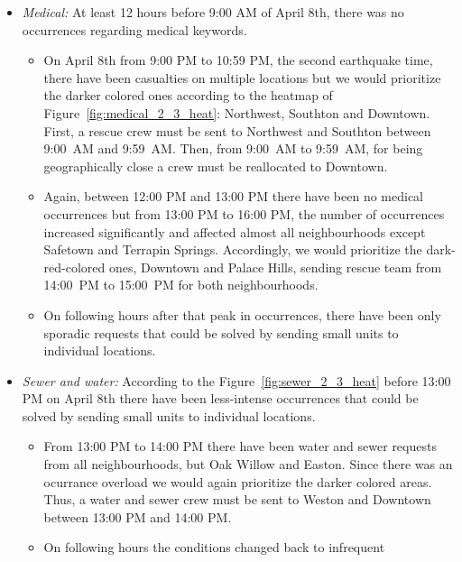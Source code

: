 \begin{itemize}                                                                  
    \item \emph{Medical:} At least 12 hours before 9:00 AM of April 8th, there
    was no occurrences regarding medical keywords. 
    \begin{itemize} 
        \item On April 8th from 9:00 PM to 10:59 PM, the second earthquake time,
        there have been casualties on multiple locations but we would prioritize 
        the darker colored ones according to the heatmap of
        Figure~\ref{fig:medical_2_3_heat}: 
        Northwest, Southton and Downtown. First, a rescue crew must be sent to 
        Northwest and Southton between 9:00~AM and 9:59~AM. Then, from 9:00~AM 
        to 9:59~AM, for being geographically close a crew must be reallocated to 
        Downtown. 
        \item Again, between 12:00 PM and 13:00 PM there have been no medical
        occurrences but from 13:00 PM to 16:00 PM, the number of occurrences
        increased significantly and affected almost all neighbourhoods except 
        Safetown and Terrapin Springs. Accordingly, we would prioritize the 
        dark-red-colored ones, Downtown and Palace Hills, sending rescue team 
        from 14:00~PM to 15:00~PM for both neighbourhoods.  
        \item On following hours after that peak in occurrences, there have been
        only sporadic requests that could be solved by sending small units to
        individual locations.
    \end{itemize} 
    \item \emph{Sewer and water:} According to the
    Figure~\ref{fig:sewer_2_3_heat} before 13:00 PM on April 8th there have been 
    less-intense occurrences that could be solved by sending small units to 
    individual locations. 
    \begin{itemize}                                                                  
        \item From 13:00 PM to 14:00 PM there have been water and sewer requests 
        from all neighbourhoods, but Oak Willow and Easton. Since there was an 
        ocurrance overload we would again prioritize the darker colored areas. 
        Thus, a water and sewer crew must be sent to Weston and Downtown between 
        13:00 PM and 14:00 PM. 
        \item On following hours the conditions changed back to infrequent

\end{itemize}
\end{itemize}
